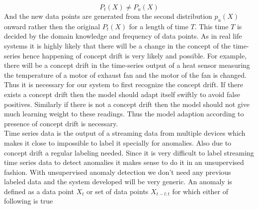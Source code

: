 \documentclass[12pt]{article}
\begin{document}
\begin{equation}
    P_t(X) \neq P_u(X)
\end{equation}
And the new data points are generated from the second distribution $p_u(X)$ onward rather then the original $P_t(X)$ for a length of time $T$. This time $T$ is decided by the domain knowledge and frequency of data points.
As in real life systems it is highly likely that there will be a change in the concept of the time-series hence happening of concept drift is very likely and possible. For example, there will be a concept drift in the time-series output of a heat sensor measuring the temperature of a motor of exhaust fan and the motor of the fan is changed. Thus it is necessary for our system to first recognize the concept drift. If there exists a concept drift then the model should adapt itself swiftly to avoid false positives. Similarly if there is not a concept drift then the model should not give much learning weight to these readings. Thus the model adaption according to presence of concept drift is necessary.\\
\break
Time series data is the output of a streaming data from multiple devices which makes it close to impossible to label it specially for anomalies. Also due to concept drift a regular labeling needed. Since it is very difficult to label streaming time series data to detect anomalies it makes sense to do it in an unsupervised fashion. With unsupervised anomaly detection we don't need any previous labeled data and the system developed will be very generic.
An anomaly is defined as a data point $X_t$ or set of data points $X_{t-l:t}$ for which either of following is true
\end{document}
